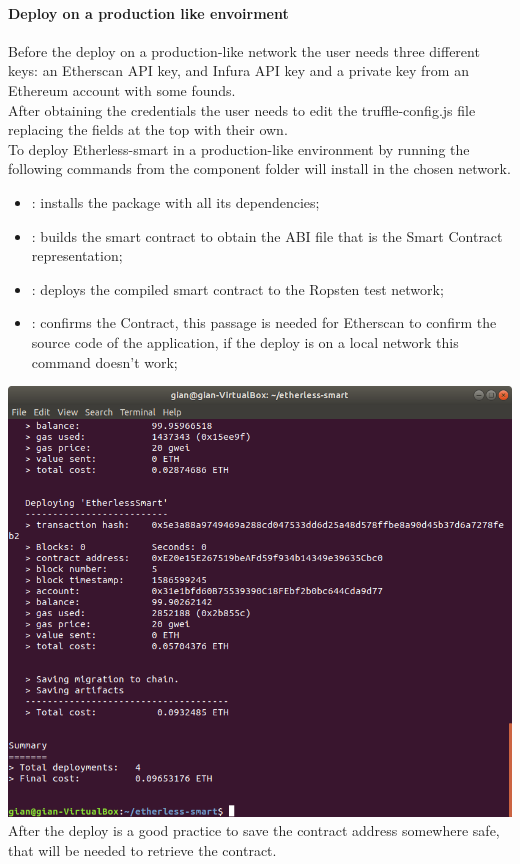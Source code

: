 \paragraph{Deploy on a production like envoirment}
Before the deploy on a production-like network the user needs three different keys: an Etherscan API
key, and Infura API key and a private key from an Ethereum account with some founds.\\
After obtaining the credentials the user needs to edit the truffle-config.js file replacing the fields at the top with their own. \\
To deploy Etherless-smart in a production-like environment
by running the following commands from the component folder will install in the chosen network.
\begin{itemize}
    \item {} : installs the package with all its dependencies;
    \item {}: builds the smart contract to obtain the ABI file that is the Smart Contract representation;
    \item {}: deploys the compiled smart contract to the Ropsten test network;
    \item {}: confirms the Contract, this passage is needed for Etherscan to confirm the source code of the application, if the deploy is on a local network this command doesn't work;
\end{itemize}
\includegraphics[width=\textwidth]{res/img/deployContract.png}
After the deploy is a good practice to save the contract address somewhere safe, that will be needed to retrieve the contract.
